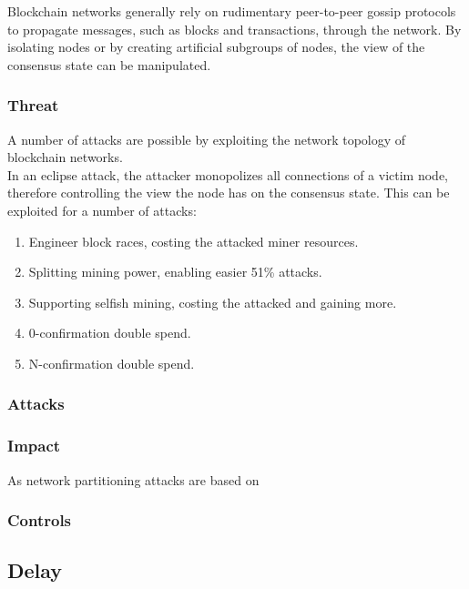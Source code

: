 \documentclass[11pt,a4paper,draft]{article}
\begin{document}
Blockchain networks generally rely on rudimentary peer-to-peer gossip protocols to propagate messages, such as blocks and transactions, through the network. By isolating nodes or by creating artificial subgroups of nodes, the view of the consensus state can be manipulated.\\

\subsubsection{Threat}

A number of attacks are possible by exploiting the network topology of blockchain networks.\\

In an eclipse attack, the attacker monopolizes all connections of a victim node, therefore controlling the view the node has on the consensus state. This can be exploited for a number of attacks:\\
\begin{enumerate}
  \item Engineer block races, costing the attacked miner resources.
  \item Splitting mining power, enabling easier 51\% attacks.
  \item Supporting selfish mining, costing the attacked and gaining more.
  \item 0-confirmation double spend.
  \item N-confirmation double spend.
\end{enumerate}

\subsubsection{Attacks}

\subsubsection{Impact}

As network partitioning attacks are based on

\subsubsection{Controls}

\subsection{Delay}
\end{document}
